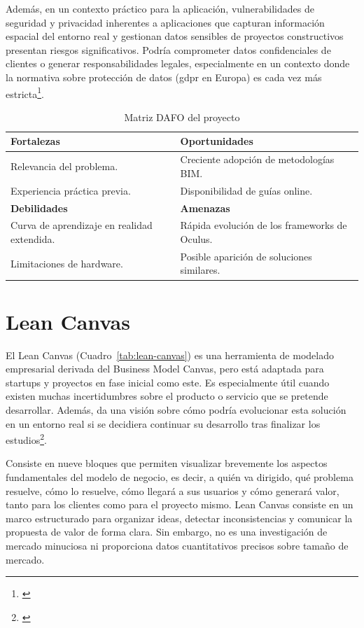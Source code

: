 \begin{itemize}
Además, en un contexto práctico para la aplicación, vulnerabilidades de seguridad y privacidad inherentes a aplicaciones que capturan información espacial del entorno real y gestionan datos sensibles de proyectos constructivos presentan riesgos significativos. Podría comprometer datos confidenciales de clientes o generar responsabilidades legales, especialmente en un contexto donde la normativa sobre protección de datos (\gls{gdpr} en Europa) es cada vez más estricta\footnote{\cite{eu2016gdpr}}.
\end{itemize}

\begin{table}[!htb]
\centering
\caption{Matriz DAFO del proyecto}
\label{tab:dafo}
\begin{tabular}{|p{4cm}|p{4cm}|}
\hline
\textbf{Fortalezas} & \textbf{Oportunidades} \\
\hline
Relevancia del problema. & Creciente adopción de metodologías BIM. \\
Experiencia práctica previa. & Disponibilidad de guías online. \\
\hline
\textbf{Debilidades} & \textbf{Amenazas} \\
\hline
Curva de aprendizaje en realidad extendida. & Rápida evolución de los frameworks de Oculus. \\
Limitaciones de hardware. & Posible aparición de soluciones similares. \\
\hline
\end{tabular}
\end{table}

\section{Lean Canvas} 

El Lean Canvas (Cuadro~\ref{tab:lean-canvas})  es una herramienta de modelado empresarial derivada del Business Model Canvas, pero está adaptada para startups y proyectos en fase inicial como este. Es especialmente útil cuando existen muchas incertidumbres sobre el producto o servicio que se pretende desarrollar. Además, da una visión sobre cómo podría evolucionar esta solución en un entorno real si se decidiera continuar su desarrollo tras finalizar los estudios\footnote{\cite{maurya2012running}}.

Consiste en nueve bloques que permiten visualizar brevemente los aspectos fundamentales del modelo de negocio, es decir, a quién va dirigido, qué problema resuelve, cómo lo resuelve, cómo llegará a sus usuarios y cómo generará valor, tanto para los clientes como para el proyecto mismo. Lean Canvas consiste en un marco estructurado para organizar ideas, detectar inconsistencias y comunicar la propuesta de valor de forma clara. Sin embargo, no es una investigación de mercado minuciosa ni proporciona datos cuantitativos precisos sobre tamaño de mercado.

